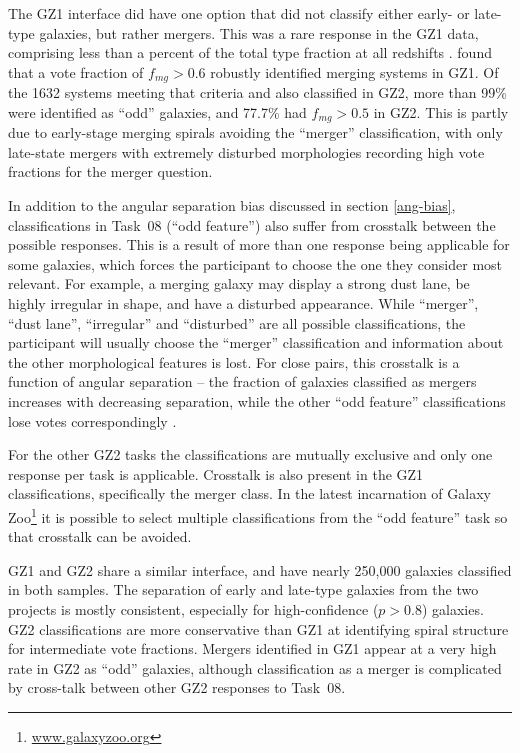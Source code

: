 \documentclass[useAMS,usenatbib]{mn2e}
\begin{document}
The GZ1 interface did have one option that did not classify either early- or late-type galaxies, but rather mergers. This was a rare response in the GZ1 data, comprising less than a percent of the total type fraction at all redshifts \citep{bam09}. \citet{dar10a} found that a vote fraction of $f_{mg} > 0.6$ robustly identified merging systems in GZ1. Of the 1632 systems meeting that criteria and also classified in GZ2, more than 99\% were identified as ``odd'' galaxies, and 77.7\% had $f_{mg}>0.5$ in GZ2. This is partly due to early-stage merging spirals avoiding the ``merger'' classification, with only late-state mergers with extremely disturbed morphologies recording high vote fractions for the merger question. 

In addition to the angular separation bias discussed in section \ref{ang-bias}, classifications in Task~08 (``odd feature'') also suffer from crosstalk between the possible responses. This is a result of more than one response being applicable for some galaxies, which forces the participant to choose the one they consider most relevant. For example, a merging galaxy may display a strong dust lane, be highly irregular in shape, and have a disturbed appearance. While ``merger'', ``dust lane'', ``irregular'' and ``disturbed'' are all possible classifications, the participant will usually choose the ``merger'' classification and information about the other morphological features is lost. For close pairs, this crosstalk is a function of angular separation -- the fraction of galaxies classified as mergers increases with decreasing separation, while the other ``odd feature'' classifications lose votes correspondingly \citep{cas13}.

For the other GZ2 tasks the classifications are mutually exclusive and only one response per task is applicable. Crosstalk is also present in the GZ1 classifications, specifically the merger class. In the latest incarnation of Galaxy Zoo\footnote{\url{www.galaxyzoo.org}} it is possible to select multiple classifications from the ``odd feature'' task so that crosstalk can be avoided.

GZ1 and GZ2 share a similar interface, and have nearly 250,000 galaxies classified in both samples. The separation of early and late-type galaxies from the two projects is mostly consistent, especially for high-confidence ($p>0.8$) galaxies. GZ2 classifications are more conservative than GZ1 at identifying spiral structure for intermediate vote fractions. Mergers identified in GZ1 appear at a very high rate in GZ2 as ``odd'' galaxies, although classification as a merger is complicated by cross-talk between other GZ2 responses to Task~08. 
\end{document}

